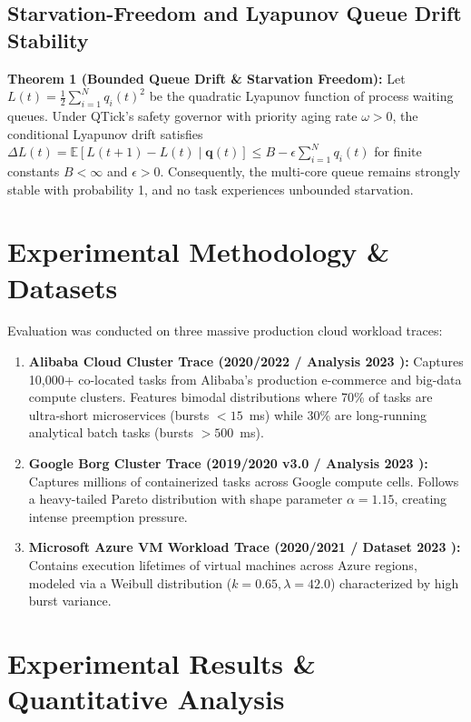 \documentclass[journal]{IEEEtran}
\begin{document}
\subsection{Starvation-Freedom and Lyapunov Queue Drift Stability}
\textbf{Theorem 1 (Bounded Queue Drift \& Starvation Freedom):} Let $L(t) = \frac{1}{2} \sum_{i=1}^{N} q_i(t)^2$ be the quadratic Lyapunov function of process waiting queues. Under QTick's safety governor with priority aging rate $\omega > 0$, the conditional Lyapunov drift satisfies $\Delta L(t) = \mathbb{E}[L(t+1) - L(t) \mid \mathbf{q}(t)] \le B - \epsilon \sum_{i=1}^N q_i(t)$ for finite constants $B < \infty$ and $\epsilon > 0$. Consequently, the multi-core queue remains strongly stable with probability 1, and no task experiences unbounded starvation.

\section{Experimental Methodology \& Datasets}
Evaluation was conducted on three massive production cloud workload traces:
\begin{enumerate}
    \item \textbf{Alibaba Cloud Cluster Trace (2020/2022 / Analysis 2023 \cite{alibaba2023cluster}):} Captures 10,000+ co-located tasks from Alibaba's production e-commerce and big-data compute clusters. Features bimodal distributions where 70\% of tasks are ultra-short microservices (bursts $< 15$~ms) while 30\% are long-running analytical batch tasks (bursts $> 500$~ms).
    \item \textbf{Google Borg Cluster Trace (2019/2020 v3.0 / Analysis 2023 \cite{google2023borg}):} Captures millions of containerized tasks across Google compute cells. Follows a heavy-tailed Pareto distribution with shape parameter $\alpha = 1.15$, creating intense preemption pressure.
    \item \textbf{Microsoft Azure VM Workload Trace (2020/2021 / Dataset 2023 \cite{azure2023vm}):} Contains execution lifetimes of virtual machines across Azure regions, modeled via a Weibull distribution ($k = 0.65, \lambda = 42.0$) characterized by high burst variance.
\end{enumerate}

\section{Experimental Results \& Quantitative Analysis}
\end{document}
